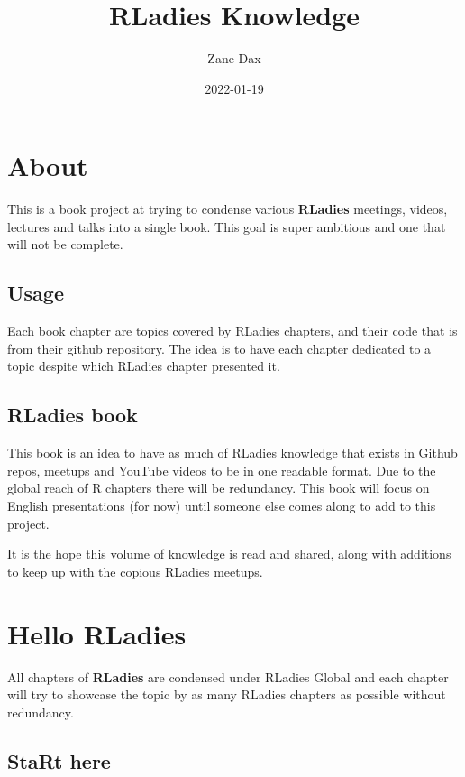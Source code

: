 \documentclass[
]{book}
\title{RLadies Knowledge}
\author{Zane Dax}
\date{2022-01-19}
\theoremstyle{definition}
\theoremstyle{definition}
\theoremstyle{definition}
\theoremstyle{definition}
\theoremstyle{remark}
\begin{document}
\maketitle

{
\setcounter{tocdepth}{1}
\tableofcontents
}
\hypertarget{about}{%
\chapter{About}\label{about}}

This is a book project at trying to condense various \textbf{RLadies} meetings, videos, lectures and talks into a single book. This goal is super ambitious and one that will not be complete.

\hypertarget{usage}{%
\section{Usage}\label{usage}}

Each book chapter are topics covered by RLadies chapters, and their code that is from their github repository. The idea is to have each chapter dedicated to a topic despite which RLadies chapter presented it.

\hypertarget{rladies-book}{%
\section{RLadies book}\label{rladies-book}}

This book is an idea to have as much of RLadies knowledge that exists in Github repos, meetups and YouTube videos to be in one readable format. Due to the global reach of R chapters there will be redundancy. This book will focus on English presentations (for now) until someone else comes along to add to this project.

It is the hope this volume of knowledge is read and shared, along with additions to keep up with the copious RLadies meetups.

\hypertarget{hello-rladies}{%
\chapter{Hello RLadies}\label{hello-rladies}}

All chapters of \textbf{RLadies} are condensed under RLadies Global and each chapter will try to showcase the topic by as many RLadies chapters as possible without redundancy.

\hypertarget{start-here}{%
\section{StaRt here}\label{start-here}}
\end{document}
